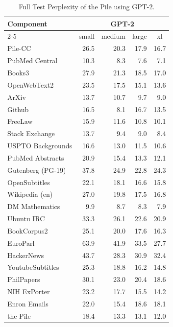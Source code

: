 \documentclass[11pt,a4paper]{article}
\begin{document}
\begin{appendices}
\begin{table}[ht]
    \centering
    \begin{tabular}{l rrrr}
    \toprule
        \textbf{Component} 
        & \multicolumn{4}{c}{GPT-2}
        \\ \cmidrule(lr){2-5}
        & \multicolumn{1}{c}{small}
        & \multicolumn{1}{c}{medium}
        & \multicolumn{1}{c}{large}
        & \multicolumn{1}{c}{xl}
        \\
        \midrule
    Pile-CC & 26.5 & 20.3 & 17.9 & 16.7  \\
    PubMed Central & 10.3 & 8.3 & 7.6 & 7.1  \\
    Books3 & 27.9 & 21.3 & 18.5 & 17.0  \\
    OpenWebText2 & 23.5 & 17.5 & 15.1 & 13.6  \\
    ArXiv & 13.7 & 10.7 & 9.7 & 9.0  \\
    Github & 16.5 & 8.1 & 16.7 & 13.5  \\
    FreeLaw & 15.9 & 11.6 & 10.8 & 10.1  \\
    Stack Exchange & 13.7 & 9.4 & 9.0 & 8.4  \\
    USPTO Backgrounds & 16.6 & 13.0 & 11.5 & 10.6  \\
    PubMed Abstracts & 20.9 & 15.4 & 13.3 & 12.1  \\
    Gutenberg (PG-19) & 37.8 & 24.9 & 22.8 & 24.3  \\
    OpenSubtitles & 22.1 & 18.1 & 16.6 & 15.8  \\
    Wikipedia (en) & 27.0 & 19.8 & 17.5 & 16.8  \\
    DM Mathematics & 9.9 & 8.7 & 8.3 & 7.9  \\
    Ubuntu IRC & 33.3 & 26.1 & 22.6 & 20.9  \\
    BookCorpus2 & 25.1 & 20.0 & 17.6 & 16.3  \\
    EuroParl & 63.9 & 41.9 & 33.5 & 27.7  \\
    HackerNews & 43.7 & 28.3 & 30.9 & 32.4  \\
    YoutubeSubtitles & 25.3 & 18.8 & 16.2 & 14.8  \\
    PhilPapers & 30.1 & 23.0 & 20.4 & 18.6  \\
    NIH ExPorter & 23.2 & 17.7 & 15.5 & 14.2  \\
    Enron Emails & 22.0 & 15.4 & 18.6 & 18.1  \\
    \midrule
    the Pile & 18.4 & 13.3 & 13.1 & 12.0 \\
        \bottomrule
    \end{tabular}
\caption{Full Test Perplexity of the Pile using GPT-2.}
\label{table:pile_perplexity_fullgpt2}
\end{table}


\end{appendices}
\end{document}
